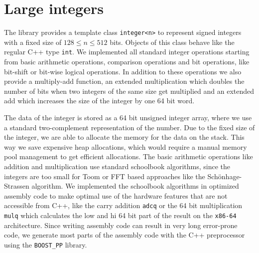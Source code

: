 \documentclass[oribibl,a4paper]{llncs2e/llncs}
\begin{document}

\section{Large integers}
The library provides a template class \verb|integer<n>| to represent signed integers with a fixed size of $128 \le n \le 512$ bits.
Objects of this class behave like the regular C++ type \verb|int|.
We implemented all standard integer operations starting from basic arithmetic operations, comparison operations and bit operations, like bit-shift or bit-wise logical operations.
In addition to these operations we also provide a multiply-add function, an extended multiplication which doubles the number of bits when two integers of the same size get multiplied and an extended add which increases the size of the integer by one 64 bit word.

The data of the integer is stored as a 64 bit unsigned integer array, where we use a standard two-complement representation of the number.
Due to the fixed size of the integer, we are able to allocate the memory for the data on the stack.
This way we save expensive heap allocations, which would require a manual memory pool management to get efficient allocations.
The basic arithmetic operations like addition and multiplication use standard schoolbook algorithms, since the integers are too small for Toom\cite{Toom} or FFT based approaches like the Sch\"onhage-Strassen algorithm\cite{Schonhage}.
We implemented the schoolbook algorithms in optimized assembly code to make optimal use of the hardware features that are not accessible from C++, like the carry addition \verb|adcq| or the 64 bit multiplication \verb|mulq| which calculates the low and hi 64 bit part of the result on the \verb|x86-64| architecture.
Since writing assembly code can result in very long error-prone code, we generate most parts of the assembly code with the C++ preprocessor using the \verb|BOOST_PP| library.
\end{document}
